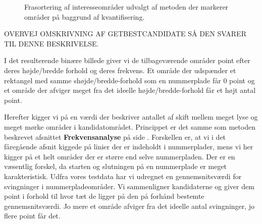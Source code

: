 \begin{figure}[htbp]
  \centering
  \begin{minipage}[b]{5 cm}
  \end{minipage}
  \begin{minipage}[b]{5 cm}
  \end{minipage}
  \caption{Frasortering af interesseområder udvalgt af metoden der markerer områder på baggrund af kvantifisering.}
   \label{fig:DetectQuant-cleanup}
\end{figure}


OVERVEJ OMSKRIVNING AF GETBESTCANDIDATE SÅ DEN SVARER TIL DENNE BESKRIVELSE.

I det resulterende binære billede giver vi de tilbageværende områder point efter deres højde/bredde forhold og deres frekvens. Et område der udspænder et rektangel med samme shøjde/bredde-forhold som en nummerplade får 0 point og et område der afviger meget fra det ideelle højde/bredde-forhold får et højt antal point.

Herefter kigger vi på en værdi der beskriver antallet af skift mellem meget lyse og meget mørke områder i kandidatområdet. Princippet er det samme som metoden beskrevet afsnittet \textbf{Frekvensanalyse} på side \pageref{sec:frekvensanalyse}. Forskellen er, at vi i det fåregående afsnit kiggede på linier der er indeholdt i nummerplader, mens vi her kigger på et helt områder der er større end selve nummerpladen. Der er en væsentlig forskel, da starten og slutningen på en nummerplade er meget karakteristisk. Udfra vores testdata har vi udregnet en gennemsnitsværdi for svingninger i nummerpladeområder. Vi sammenligner kandidaterne og giver dem point i forhold til hvor tæt de ligger på den på forhånd bestemte gennemsnitsværdi. Jo mere et område afviger fra det ideelle antal svingninger, jo flere point får det.

